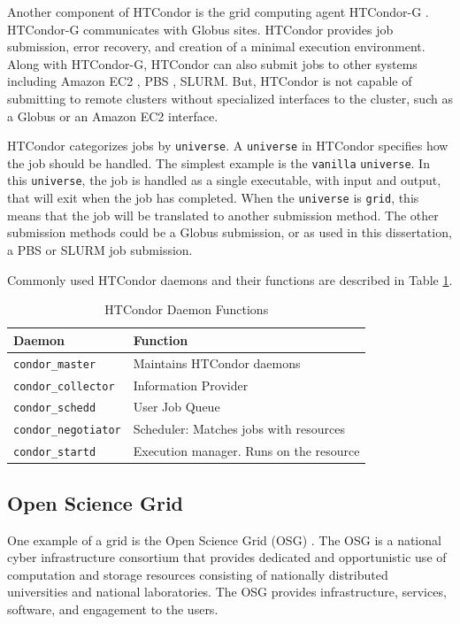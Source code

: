 Another component of HTCondor is the grid computing agent HTCondor-G \cite{frey2002condor}.  HTCondor-G communicates with Globus \cite{foster1997globus} sites.  HTCondor provides job submission, error recovery, and creation of a minimal execution environment.  Along with HTCondor-G, HTCondor can also submit jobs to other systems including Amazon EC2 \cite{amazonec2}, PBS \cite{pbstorque}, SLURM.  But, HTCondor is not capable of submitting to remote clusters without specialized interfaces to the cluster, such as a Globus or an Amazon EC2 interface.

HTCondor categorizes jobs by \texttt{universe}.  A \texttt{universe} in HTCondor specifies how the job should be handled.  The simplest example is the \texttt{vanilla} \texttt{universe}.  In this \texttt{universe}, the job is handled as a single executable, with input and output, that will exit when the job has completed.  When the \texttt{universe} is \texttt{grid}, this means that the job will be translated to another submission method.  The other submission methods could be a Globus submission, or as used in this dissertation, a PBS or SLURM \cite{yoo2003slurm} job submission.

Commonly used HTCondor daemons and their functions are described in Table \ref{table:condordaemons}.

\begin{table}
	\centering
	\begin{tabular}{| l | l |}
		\hline
		Daemon & Function \\
		\hline \hline
		\texttt{condor\_master} & Maintains HTCondor daemons   \\ \hline
		\texttt{condor\_collector} & Information Provider \\ \hline
		\texttt{condor\_schedd} & User Job Queue \\ \hline
		\texttt{condor\_negotiator} & Scheduler: Matches jobs with resources \\ \hline
		\texttt{condor\_startd} & Execution manager.  Runs on the resource \\ \hline
	\end{tabular}
	\caption{HTCondor Daemon Functions} \label{table:condordaemons}
\end{table}

\subsection{Open Science Grid}
One example of a grid is the Open Science Grid (OSG) \cite{pordes2007open}. The OSG is a national cyber infrastructure consortium that provides dedicated and opportunistic use of computation and storage resources consisting of nationally distributed universities and national laboratories. The OSG provides infrastructure, services, software, and engagement to the users.  

